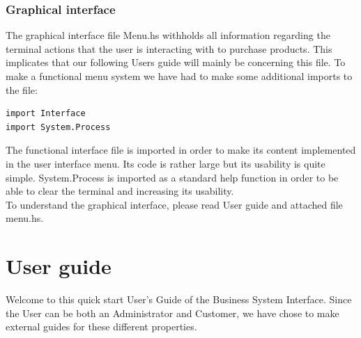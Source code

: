 \documentclass[11pt]{article}
\begin{document}
\subsubsection{Graphical interface}
The graphical interface file Menu.hs withholds all information regarding the terminal actions that the user is interacting with to purchase products. This implicates that our following Users guide will mainly be concerning this file. To make a functional menu system we have had to make some additional imports to the file:
\begin{lstlisting}
import Interface
import System.Process
\end{lstlisting}
The functional interface file is imported in order to make its content implemented in the user interface menu. Its code is rather large but its usability is quite simple. System.Process is imported as a standard help function in order to be able to clear the terminal and increasing its usability.
\\
To understand the graphical interface, please read User guide and attached file menu.hs.
\newpage
\section{User guide}
Welcome to this quick start User's Guide of the Business System Interface. Since the User can be both an Administrator and Customer, we have chose to make external guides for these different properties.
\end{document}
